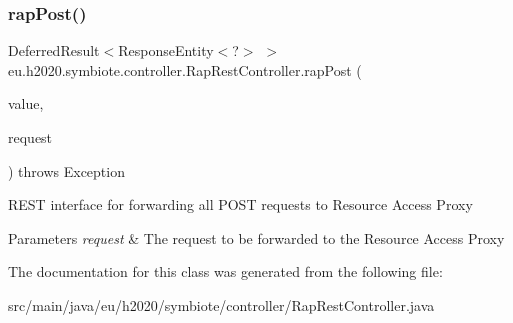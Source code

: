 \subsubsection{\texorpdfstring{rap\+Post()}{rapPost()}}
{\footnotesize\ttfamily Deferred\+Result$<$Response\+Entity$<$?$>$ $>$ eu.\+h2020.\+symbiote.\+controller.\+Rap\+Rest\+Controller.\+rap\+Post (\begin{DoxyParamCaption}\item[{@Request\+Body String}]{value,  }\item[{Http\+Servlet\+Request}]{request }\end{DoxyParamCaption}) throws Exception}

R\+E\+ST interface for forwarding all P\+O\+ST requests to Resource Access Proxy


\begin{DoxyParams}{Parameters}
{\em request} & The request to be forwarded to the Resource Access Proxy \\
\hline
\end{DoxyParams}


The documentation for this class was generated from the following file\+:\begin{DoxyCompactItemize}
\item 
src/main/java/eu/h2020/symbiote/controller/Rap\+Rest\+Controller.\+java\end{DoxyCompactItemize}
